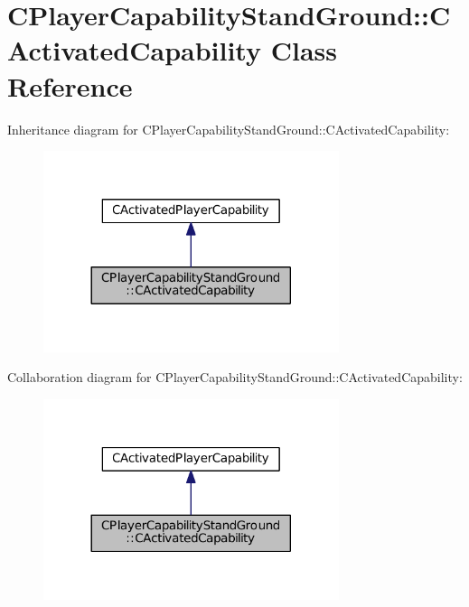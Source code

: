 \hypertarget{classCPlayerCapabilityStandGround_1_1CActivatedCapability}{}\section{C\+Player\+Capability\+Stand\+Ground\+:\+:C\+Activated\+Capability Class Reference}
\label{classCPlayerCapabilityStandGround_1_1CActivatedCapability}


Inheritance diagram for C\+Player\+Capability\+Stand\+Ground\+:\+:C\+Activated\+Capability\+:\nopagebreak
\begin{figure}[H]
\begin{center}
\leavevmode
\includegraphics[width=245pt]{classCPlayerCapabilityStandGround_1_1CActivatedCapability__inherit__graph}
\end{center}
\end{figure}


Collaboration diagram for C\+Player\+Capability\+Stand\+Ground\+:\+:C\+Activated\+Capability\+:\nopagebreak
\begin{figure}[H]
\begin{center}
\leavevmode
\includegraphics[width=245pt]{classCPlayerCapabilityStandGround_1_1CActivatedCapability__coll__graph}
\end{center}
\end{figure}
